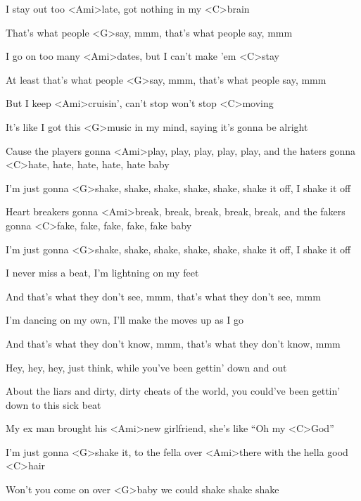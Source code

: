 
\zs
I stay out too <Ami>late, got nothing in my <C>brain

That's what people <G>say, mmm, that's what people say, mmm

I go on too many <Ami>dates, but I can't make 'em <C>stay

At least that's what people <G>say, mmm, that's what people say, mmm
\ks

\zr
But I keep <Ami>cruisin', can't stop won't stop <C>moving

It's like I got this <G>music in my mind, saying it's gonna be alright

Cause the players gonna <Ami>play, play, play, play, play, and the haters gonna <C>hate, hate, hate, hate, hate baby

I'm just gonna <G>shake, shake, shake, shake, shake, shake it off, I shake it off

Heart breakers gonna <Ami>break, break, break, break, break, and the fakers gonna <C>fake, fake, fake, fake, fake baby

I'm just gonna <G>shake, shake, shake, shake, shake, shake it off, I shake it off
\kr

\zs
I never miss a beat, I'm lightning on my feet

And that's what they don't see, mmm, that's what they don't see, mmm

I'm dancing on my own, I'll make the moves up as I go

And that's what they don't know, mmm, that's what they don't know, mmm
\ks

\zr\kr

\zs
Hey, hey, hey, just think, while you've been gettin' down and out

About the liars and dirty, dirty cheats of the world, you could've been gettin' down to this sick beat
\ks

\zs
My ex man brought his <Ami>new girlfriend, she's like ``Oh my <C>God''

I'm just gonna <G>shake it, to the fella over <Ami>there with the hella good <C>hair

Won't you come on over <G>baby we could shake shake shake
\ks

\zr\kr

\kp
